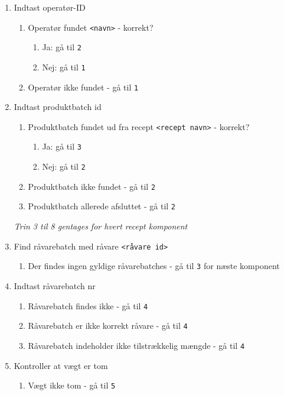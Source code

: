 \documentclass[a4paper]{article}
\begin{document}
\begin{enumerate}
  \item Indtast operatør-ID
    \begin{enumerate}
      \item Operatør fundet \texttt{<navn>} - korrekt?
        \begin{enumerate}
          \item Ja: gå til \texttt{2}
          \item Nej: gå til \texttt{1}
        \end{enumerate}
      \item Operatør ikke fundet - gå til \texttt{1}
    \end{enumerate}
  \item Indtast produktbatch id
    \begin{enumerate}
      \item Produktbatch fundet ud fra recept \texttt{<recept navn>} - korrekt?
        \begin{enumerate}
          \item Ja: gå til \texttt{3}
          \item Nej: gå til \texttt{2}
        \end{enumerate}
      \item Produktbatch ikke fundet - gå til \texttt{2}
      \item Produktbatch allerede afsluttet - gå til \texttt{2}
    \end{enumerate}
    \emph{Trin 3 til 8 gentages for hvert recept komponent}
  \item Find råvarebatch med råvare \texttt{<råvare id>}
    \begin{enumerate}
      \item Der findes ingen gyldige råvarebatches - gå til \texttt{3} for næste komponent
    \end{enumerate}
  \item Indtast råvarebatch nr
    \begin{enumerate}
      \item Råvarebatch findes ikke - gå til \texttt{4}
      \item Råvarebatch er ikke korrekt råvare - gå til \texttt{4}
      \item Råvarebatch indeholder ikke tilstrækkelig mængde - gå til \texttt{4}
    \end{enumerate}
  \item Kontroller at vægt er tom
    \begin{enumerate}
      \item Vægt ikke tom - gå til \texttt{5}

\end{enumerate}
\end{enumerate}
\end{document}
